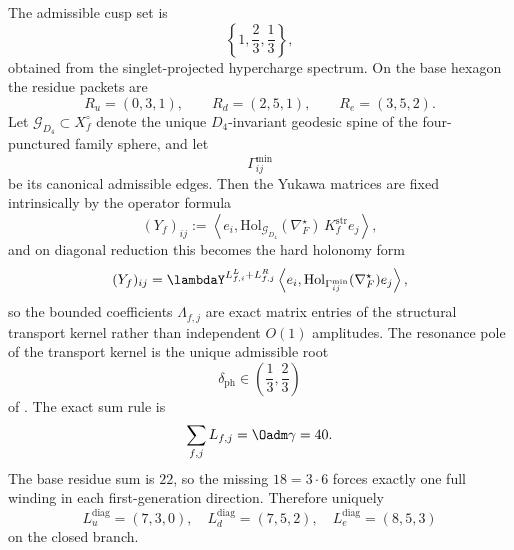 \begin{theorem}
\label{thm:exact-transport-closure}
\label{thm:canonical-transport-kernel}
The admissible cusp set is
\[
\left\{1,\frac23,\frac13\right\},
\]
obtained from the singlet-projected hypercharge spectrum. On the base hexagon the residue packets
are
\[
R_u=(0,3,1),
\qquad
R_d=(2,5,1),
\qquad
R_e=(3,5,2).
\]
Let $\mathcal G_{D_4}\subset X_f^\circ$ denote the unique $D_4$-invariant geodesic spine of the
four-punctured family sphere, and let
\[
\Gamma_{ij}^{\min}
\]
be its canonical admissible edges. Then the Yukawa matrices are fixed intrinsically by the operator
formula
\[
(Y_f)_{ij}
:=
\left\langle e_i,\mathrm{Hol}_{\mathcal G_{D_4}}(\nabla_F^\star)\,K_f^{\mathrm{str}}e_j\right\rangle,
\]
and on diagonal reduction this becomes the hard holonomy form
\[
(Y_f)_{ij}
=
\lambdaY^{L^L_{f,i}+L^R_{f,j}}
\left\langle e_i,\mathrm{Hol}_{\Gamma_{ij}^{\min}}(\nabla_F^\star)e_j\right\rangle,
\]
so the bounded coefficients $\Lambda_{f,j}$ are exact matrix entries of the structural transport
kernel rather than independent $O(1)$ amplitudes. The resonance pole of the transport kernel is the
unique admissible root
\[
\delta_{\mathrm{ph}}\in\left(\frac13,\frac23\right)
\]
of . The exact sum rule is
\[
\sum_{f,j}L_{f,j}=\Oadm\gamma=40.
\]
The base residue sum is $22$, so the missing $18=3\cdot 6$ forces exactly one full winding in
each first-generation direction. Therefore uniquely
\[
L_u^{\mathrm{diag}}=(7,3,0),\quad
L_d^{\mathrm{diag}}=(7,5,2),\quad
L_e^{\mathrm{diag}}=(8,5,3)
\]
on the closed branch.
\end{theorem}

